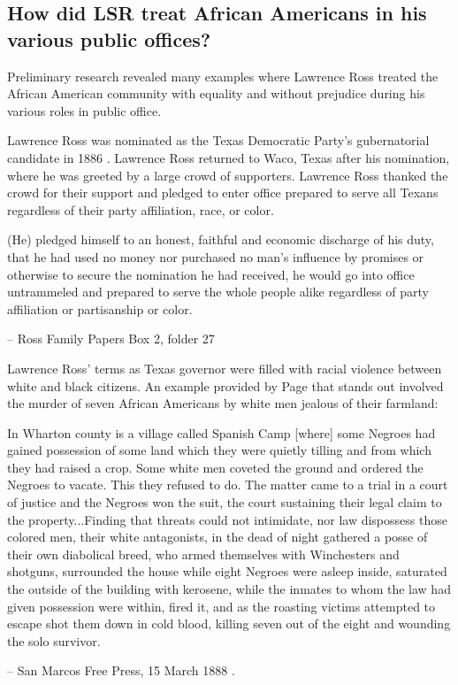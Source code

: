 \documentclass[12pt]{article}
\begin{document}
\newpage
\subsection{How did LSR treat African Americans in his various public offices?}
Preliminary research revealed many examples where Lawrence Ross treated the African American community with equality and without prejudice during his various roles in public office. 

Lawrence Ross was nominated as the Texas Democratic Party's gubernatorial candidate in 1886 \cite[pg. 150-159]{benner:sulross}. Lawrence Ross returned to Waco, Texas after his nomination, where he was greeted by a large crowd of supporters. Lawrence Ross thanked the crowd for their support and pledged to enter office prepared to serve all Texans regardless of their party affiliation, race, or color.
\begin{displayquote}
(He) pledged himself to an honest, faithful and economic discharge of his duty, that he had used no money nor purchased no man's influence by promises or otherwise to secure the nomination he had received, he would go into office untrammeled and prepared to serve the whole people alike regardless of party affiliation or partisanship or color.

-- Ross Family Papers Box 2, folder 27 \cite{rosspapers}
\end{displayquote}

Lawrence Ross' terms as Texas governor were filled with racial violence between white and black citizens. An example provided by Page that stands out involved the murder of seven African Americans by white men jealous of their farmland:
\begin{displayquote}
In Wharton county is a village called Spanish Camp [where] some Negroes had gained possession of some land which they were quietly tilling and from which they had raised a crop. Some white men coveted the ground and ordered the Negroes to vacate.  This they refused to do. The matter came to a trial in a court of justice and the Negroes won the suit, the court sustaining their legal claim to the property...Finding that threats could not intimidate, nor law dispossess those colored men, their white antagonists, in the dead of night gathered a posse of their own diabolical breed, who armed themselves with Winchesters and shotguns, surrounded the house while eight Negroes were asleep inside, saturated the outside of the building with kerosene, while the inmates to whom the law had given possession were within, fired it, and as the roasting victims attempted to escape shot them down in cold blood, killing seven out of the eight and wounding the solo survivor.

-- San Marcos Free Press, 15 March 1888 \cite{sanmarcospress}.
\end{displayquote}
\end{document}
